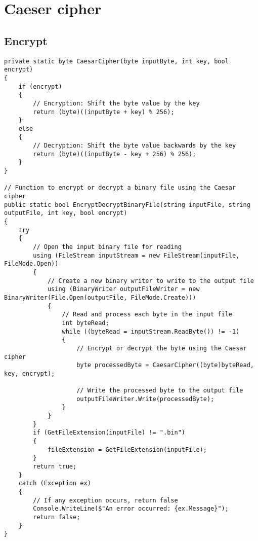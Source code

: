 \documentclass[a4paper,oneside,11pt]{book}
\begin{document}
\chapter[Caeser cipher]{Caeser cipher}
\section{Encrypt}
\begin{lstlisting}[language=Csh, caption={Endpoint to delete FITS file}]
private static byte CaesarCipher(byte inputByte, int key, bool encrypt)
{
    if (encrypt)
    {
        // Encryption: Shift the byte value by the key
        return (byte)((inputByte + key) % 256);
    }
    else
    {
        // Decryption: Shift the byte value backwards by the key
        return (byte)((inputByte - key + 256) % 256);
    }
}
    
// Function to encrypt or decrypt a binary file using the Caesar cipher
public static bool EncryptDecryptBinaryFile(string inputFile, string outputFile, int key, bool encrypt)
{
    try
    {
        // Open the input binary file for reading
        using (FileStream inputStream = new FileStream(inputFile, FileMode.Open))
        {
            // Create a new binary writer to write to the output file
            using (BinaryWriter outputFileWriter = new BinaryWriter(File.Open(outputFile, FileMode.Create)))
            {
                // Read and process each byte in the input file
                int byteRead;
                while ((byteRead = inputStream.ReadByte()) != -1)
                {
                    // Encrypt or decrypt the byte using the Caesar cipher
                    byte processedByte = CaesarCipher((byte)byteRead, key, encrypt);
    
                    // Write the processed byte to the output file
                    outputFileWriter.Write(processedByte);
                }
            }
        }
        if (GetFileExtension(inputFile) != ".bin")
        {
            fileExtension = GetFileExtension(inputFile);
        }
        return true;
    }
    catch (Exception ex)
    {
        // If any exception occurs, return false
        Console.WriteLine($"An error occurred: {ex.Message}");
        return false;
    }
}
\end{lstlisting}



\end{document}
